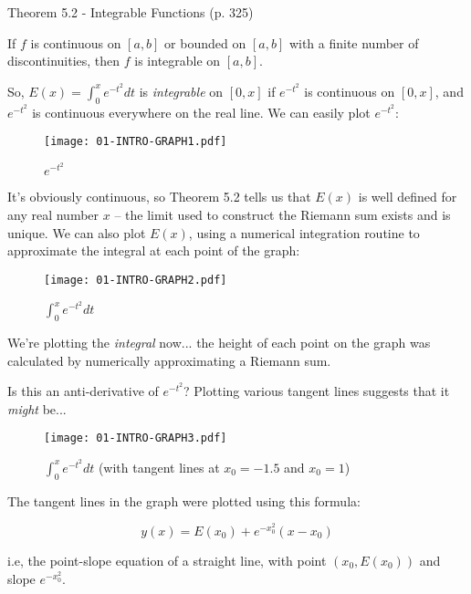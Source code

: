 \begin{framed}
\cite{briggs} Theorem 5.2 - Integrable Functions (p. 325)

If $f$ is continuous on $[a,b]$ or bounded on $[a,b]$ with a finite number of discontinuities,
then $f$ is integrable on $[a,b]$.
\end{framed}

So, $E(x) = \int_0^x e^{-t^2} dt$ is {\it integrable} on $[0,x]$ if $e^{-t^2}$ is continuous on $[0,x]$,
and $e^{-t^2}$ is continuous everywhere on the real line.  We can easily plot $e^{-t^2}$:

\begin{figure}[H]
\begin{center}
\texttt{[image: 01-INTRO-GRAPH1.pdf]}
\end{center}
\caption{$e^{-t^2}$}
\end{figure}

It's obviously continuous, so Theorem 5.2 tells us that $E(x)$ is well
defined for any real number $x$ -- the limit used to construct the
Riemann sum exists and is unique.  We can also plot $E(x)$, using a
numerical integration routine to approximate the integral at each
point of the graph:

\begin{figure}[H]
\begin{center}
\texttt{[image: 01-INTRO-GRAPH2.pdf]}
\end{center}
\caption{$\int_0^x e^{-t^2} dt$}
\end{figure}

We're plotting the {\it integral} now... the height of each point on the graph
was calculated by numerically approximating a Riemann sum.

Is this an anti-derivative of $e^{-t^2}$?  Plotting various tangent lines suggests
that it {\it might} be...

\begin{figure}[H]
\begin{center}
\texttt{[image: 01-INTRO-GRAPH3.pdf]}
\end{center}
\caption{$\int_0^x e^{-t^2} dt$ (with tangent lines at $x_0=-1.5$ and $x_0=1$)}
\end{figure}

The tangent lines in the graph were plotted using this formula:

$$ y(x) = E(x_0) + e^{-x_0^2}(x-x_0)$$

i.e, the point-slope equation of a straight line, with point $(x_0, E(x_0))$ and slope $e^{-x_0^2}$.

